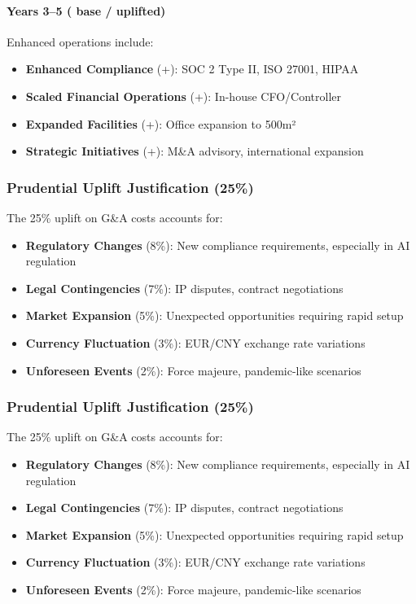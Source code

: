 \paragraph{Years 3--5 ( base /  uplifted)}
Enhanced operations include:
\begin{itemize}
    \item \textbf{Enhanced Compliance} (+): SOC 2 Type II, ISO 27001, HIPAA
    \item \textbf{Scaled Financial Operations} (+): In-house CFO/Controller
    \item \textbf{Expanded Facilities} (+): Office expansion to 500m²
    \item \textbf{Strategic Initiatives} (+): M\&A advisory, international expansion
\end{itemize}

\subsubsection{Prudential Uplift Justification (25\%)}
The 25\% uplift on G\&A costs accounts for:
\begin{itemize}
    \item \textbf{Regulatory Changes} (8\%): New compliance requirements, especially in AI regulation
    \item \textbf{Legal Contingencies} (7\%): IP disputes, contract negotiations
    \item \textbf{Market Expansion} (5\%): Unexpected opportunities requiring rapid setup
    \item \textbf{Currency Fluctuation} (3\%): EUR/CNY exchange rate variations
    \item \textbf{Unforeseen Events} (2\%): Force majeure, pandemic-like scenarios
\end{itemize}
\subsubsection{Prudential Uplift Justification (25\%)}
The 25\% uplift on G\&A costs accounts for:
\begin{itemize}
    \item \textbf{Regulatory Changes} (8\%): New compliance requirements, especially in AI regulation
    \item \textbf{Legal Contingencies} (7\%): IP disputes, contract negotiations
    \item \textbf{Market Expansion} (5\%): Unexpected opportunities requiring rapid setup
    \item \textbf{Currency Fluctuation} (3\%): EUR/CNY exchange rate variations
    \item \textbf{Unforeseen Events} (2\%): Force majeure, pandemic-like scenarios
\end{itemize}

